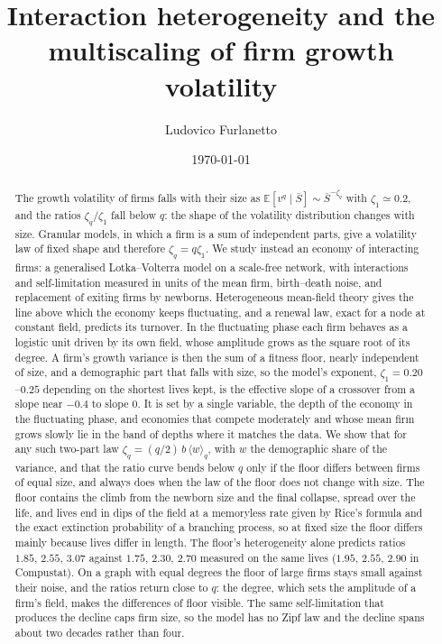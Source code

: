 \documentclass[pre,twocolumn,superscriptaddress,nofootinbib]{revtex4-2}
\newcommand{\E}{\mathbb E}
\newcommand{\Sb}{\bar S}
\begin{document}
\title{Interaction heterogeneity and the multiscaling of firm growth volatility}
\author{Ludovico Furlanetto}
\date{\today}

\begin{abstract}
The growth volatility of firms falls with their size as $\E[v^q\mid\Sb]\sim\Sb^{-\zeta_q}$ with
$\zeta_1\simeq0.2$, and the ratios $\zeta_q/\zeta_1$ fall below $q$: the shape of the volatility
distribution changes with size.  Granular models, in which a firm is a sum of independent parts,
give a volatility law of fixed shape and therefore $\zeta_q=q\zeta_1$.  We study instead an economy of
interacting firms: a generalised Lotka--Volterra model on a scale-free network, with interactions
and self-limitation measured in units of the mean firm, birth--death noise, and replacement of
exiting firms by newborns.  Heterogeneous mean-field theory gives the line above which the economy
keeps fluctuating, and a renewal law, exact for a node at constant field, predicts its turnover.  In the
fluctuating phase each firm behaves as a logistic unit driven by its own field, whose amplitude
grows as the square root of its degree.  A firm's growth variance is then the sum of a fitness floor,
nearly independent of size, and a demographic part that falls with size, so the model's exponent,
$\zeta_1=0.20$--$0.25$ depending on the shortest lives kept, is the effective slope of a crossover from a
slope near $-0.4$ to slope $0$.  It is set by a single variable, the depth of the economy in the fluctuating phase,
and economies that compete moderately and whose mean firm grows slowly lie in the band of depths where it matches
the data.  We show that for any such two-part law
$\zeta_q=(q/2)\,b\,\langle w\rangle_q$, with $w$ the demographic share of the variance, and that the ratio
curve bends below $q$ only if the floor differs between firms of equal size, and always does when the law
of the floor does not change with size.  The floor contains the climb
from the newborn size and the final collapse, spread over the life, and lives end in dips of the field at
a memoryless rate given by Rice's formula and the exact extinction probability of a branching process, so
at fixed size the floor differs mainly because lives differ in length.  The floor's heterogeneity alone
predicts ratios $1.85$, $2.55$, $3.07$ against $1.75$, $2.30$, $2.70$ measured on the same lives ($1.95$, $2.55$,
$2.90$ in Compustat).  On a graph with equal degrees the floor of large firms stays small against their noise,
and the ratios return close to $q$: the degree, which sets the amplitude of a firm's field, makes the
differences of floor visible.  The same self-limitation that produces the decline caps firm size, so the model
has no Zipf law and the decline spans about two decades rather than four.
\end{abstract}
\end{document}

